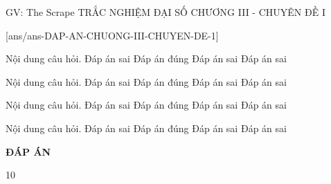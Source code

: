 \newpage
\begin{nameh}
	{GV: The Scrape}
	{TRẮC NGHIỆM ĐẠI SỐ CHƯƠNG III  - CHUYÊN ĐỀ I}
\end{nameh}
\setcounter{ex}{0}
[ans/ans-DAP-AN-CHUONG-III-CHUYEN-DE-1]
\begin{ex}%
	Nội dung câu hỏi.
	\choice
	{Đáp án sai}
	{\True Đáp án đúng}
	{Đáp án sai}
	{Đáp án sai}
\end{ex}
\begin{ex}%
	Nội dung câu hỏi.
	\choice
	{Đáp án sai}
	{\True Đáp án đúng}
	{Đáp án sai}
	{Đáp án sai}
\end{ex}
\begin{ex}%
	Nội dung câu hỏi.
	\choice
	{Đáp án sai}
	{\True Đáp án đúng}
	{Đáp án sai}
	{Đáp án sai}
\end{ex}
\begin{ex}%
	Nội dung câu hỏi.
	\choice
	{Đáp án sai}
	{\True Đáp án đúng}
	{Đáp án sai}
	{Đáp án sai}
\end{ex}


\newpage
\begin{center}
	\textbf{ĐÁP ÁN}
\end{center}
\begin{multicols}{10}
	  
\end{multicols}